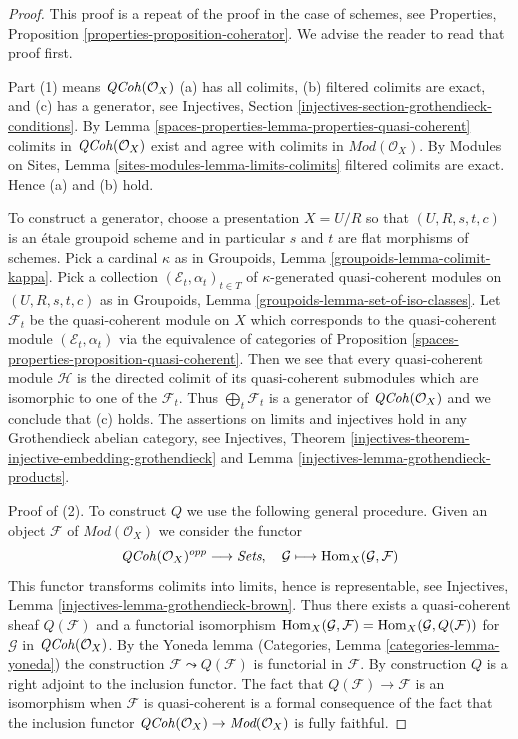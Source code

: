 \begin{proof}
This proof is a repeat of the proof in the case of schemes, see
Properties, Proposition \ref{properties-proposition-coherator}.
We advise the reader to read that proof first.

\medskip\noindent
Part (1) means $\mathit{QCoh}(\mathcal{O}_X)$ (a) has all colimits,
(b) filtered colimits are exact, and (c) has a generator, see
Injectives, Section \ref{injectives-section-grothendieck-conditions}.
By Lemma \ref{spaces-properties-lemma-properties-quasi-coherent}
colimits in $\mathit{QCoh}(\mathcal{O}_X)$ exist and agree
with colimits in $\textit{Mod}(\mathcal{O}_X)$. By
Modules on Sites, Lemma \ref{sites-modules-lemma-limits-colimits}
filtered colimits are exact. Hence (a) and (b) hold.

\medskip\noindent
To construct a generator, choose a presentation $X = U/R$ so that
$(U, R, s, t, c)$ is an
\'etale groupoid scheme and in particular $s$ and $t$ are flat morphisms
of schemes. Pick a cardinal $\kappa$ as in
Groupoids, Lemma \ref{groupoids-lemma-colimit-kappa}.
Pick a collection $(\mathcal{E}_t, \alpha_t)_{t \in T}$ of
$\kappa$-generated quasi-coherent modules on
$(U, R, s, t, c)$ as in
Groupoids, Lemma \ref{groupoids-lemma-set-of-iso-classes}.
Let $\mathcal{F}_t$ be the quasi-coherent module on $X$ which
corresponds to the quasi-coherent module $(\mathcal{E}_t, \alpha_t)$ via
the equivalence of categories of
Proposition \ref{spaces-properties-proposition-quasi-coherent}.
Then we see that every quasi-coherent module $\mathcal{H}$ is the
directed colimit of its quasi-coherent submodules which are isomorphic
to one of the $\mathcal{F}_t$. Thus $\bigoplus_t \mathcal{F}_t$ is
a generator of $\mathit{QCoh}(\mathcal{O}_X)$ and we conclude that (c) holds.
The assertions on limits and injectives hold in any
Grothendieck abelian category, see
Injectives, Theorem
\ref{injectives-theorem-injective-embedding-grothendieck} and
Lemma \ref{injectives-lemma-grothendieck-products}.

\medskip\noindent
Proof of (2). To construct $Q$ we use the following general procedure.
Given an object $\mathcal{F}$ of $\textit{Mod}(\mathcal{O}_X)$
we consider the functor
$$
\mathit{QCoh}(\mathcal{O}_X)^{opp} \longrightarrow \textit{Sets},\quad
\mathcal{G} \longmapsto \operatorname{Hom}_X(\mathcal{G}, \mathcal{F})
$$
This functor transforms colimits into limits,
hence is representable, see
Injectives, Lemma \ref{injectives-lemma-grothendieck-brown}.
Thus there exists a quasi-coherent sheaf $Q(\mathcal{F})$
and a functorial isomorphism
$\operatorname{Hom}_X(\mathcal{G}, \mathcal{F}) = \operatorname{Hom}_X(\mathcal{G}, Q(\mathcal{F}))$
for $\mathcal{G}$ in $\mathit{QCoh}(\mathcal{O}_X)$. By the Yoneda lemma
(Categories, Lemma \ref{categories-lemma-yoneda})
the construction $\mathcal{F} \leadsto Q(\mathcal{F})$ is
functorial in $\mathcal{F}$. By construction $Q$ is a right
adjoint to the inclusion functor.
The fact that $Q(\mathcal{F}) \to \mathcal{F}$ is an isomorphism
when $\mathcal{F}$ is quasi-coherent is a formal consequence of the fact
that the inclusion functor
$\mathit{QCoh}(\mathcal{O}_X) \to \textit{Mod}(\mathcal{O}_X)$
is fully faithful.
\end{proof}


